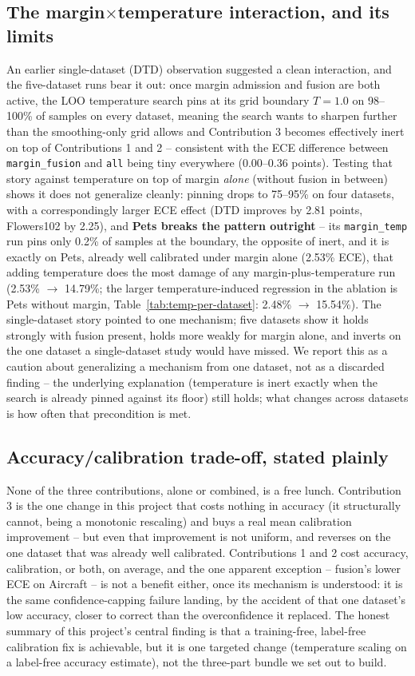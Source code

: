 \subsection{The margin$\times$temperature interaction, and its limits}

An earlier single-dataset (DTD) observation suggested a clean interaction, and the five-dataset
runs bear it out: once margin
admission and fusion are both active, the LOO temperature search pins at its grid boundary
$T = 1.0$ on 98--100\% of samples on every dataset, meaning the search wants to sharpen further
than the smoothing-only grid allows and Contribution 3 becomes effectively inert on top of Contributions 1
and 2 -- consistent with the ECE difference between \texttt{margin\_fusion} and \texttt{all}
being tiny everywhere (0.00--0.36 points). Testing that story against temperature on top of
margin \emph{alone} (without fusion in between) shows it does not generalize cleanly: pinning
drops to 75--95\% on four datasets, with a correspondingly larger ECE effect (DTD improves by
2.81 points, Flowers102 by 2.25), and \textbf{Pets breaks the pattern outright} -- its
\texttt{margin\_temp} run pins only 0.2\% of samples at the boundary, the opposite of inert, and
it is exactly on Pets, already well calibrated under margin alone (2.53\% ECE), that adding
temperature does the most damage of any margin-plus-temperature run (2.53\% $\rightarrow$
14.79\%; the larger temperature-induced regression in the ablation is Pets without margin,
Table~\ref{tab:temp-per-dataset}: 2.48\% $\rightarrow$ 15.54\%). The
single-dataset story pointed to one mechanism; five datasets show it holds strongly with fusion
present, holds more weakly for margin alone, and inverts on the one dataset a single-dataset
study would have missed. We report this as a caution about generalizing a mechanism from one
dataset, not as a discarded finding -- the underlying explanation (temperature is inert exactly
when the search is already pinned against its floor) still holds; what changes across datasets
is how often that precondition is met.

\subsection{Accuracy/calibration trade-off, stated plainly}

None of the three contributions, alone or combined, is a free lunch. Contribution 3 is the one
change in this project that costs nothing in accuracy (it structurally cannot, being a
monotonic rescaling) and buys a real mean calibration improvement -- but even that
improvement is not uniform, and reverses on the one dataset that was already well calibrated.
Contributions 1 and 2 cost accuracy, calibration, or both, on average, and the one apparent
exception -- fusion's lower ECE on Aircraft -- is not a benefit either, once its mechanism is
understood: it is the same confidence-capping failure landing, by the accident of that one
dataset's low accuracy, closer to correct than the overconfidence it replaced. The honest summary of this project's
central finding is that a training-free, label-free calibration fix is achievable, but it is one
targeted change (temperature scaling on a label-free accuracy estimate), not the three-part
bundle we set out to build.
